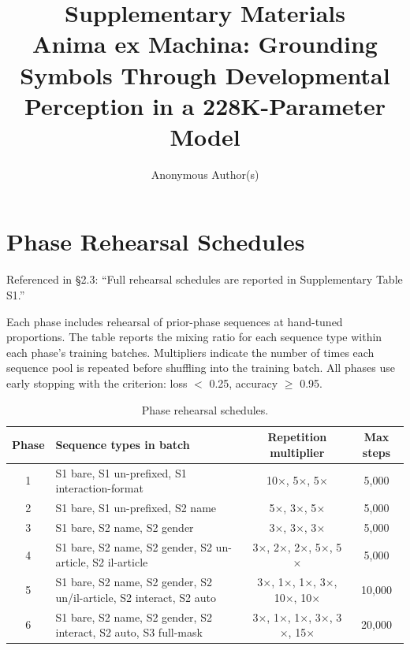 \documentclass{article}
\title{Supplementary Materials\\
\Large Anima ex Machina: Grounding Symbols Through Developmental Perception in a 228K-Parameter Model}
\author{
  Anonymous Author(s)
}
\begin{document}
\maketitle

\setcounter{section}{0}
\renewcommand{\thesection}{S\arabic{section}}
\renewcommand{\thetable}{S\arabic{table}}
\renewcommand{\thefigure}{S\arabic{figure}}

\section{Phase Rehearsal Schedules}

Referenced in \S2.3: ``Full rehearsal schedules are reported in Supplementary Table S1.''

Each phase includes rehearsal of prior-phase sequences at hand-tuned proportions. The table reports the mixing ratio for each sequence type within each phase's training batches. Multipliers indicate the number of times each sequence pool is repeated before shuffling into the training batch. All phases use early stopping with the criterion: loss $<$ 0.25, accuracy $\geq$ 0.95.

\begin{table}[htbp]
\centering
\small
\caption{Phase rehearsal schedules.}
\label{tab:rehearsal}
\begin{tabular}{clcc}
\toprule
Phase & Sequence types in batch & Repetition multiplier & Max steps \\
\midrule
1 & S1 bare, S1 un-prefixed, S1 interaction-format & 10$\times$, 5$\times$, 5$\times$ & 5,000 \\
2 & S1 bare, S1 un-prefixed, S2 name & 5$\times$, 3$\times$, 5$\times$ & 5,000 \\
3 & S1 bare, S2 name, S2 gender & 3$\times$, 3$\times$, 3$\times$ & 5,000 \\
4 & S1 bare, S2 name, S2 gender, S2 un-article, S2 il-article & 3$\times$, 2$\times$, 2$\times$, 5$\times$, 5$\times$ & 5,000 \\
5 & S1 bare, S2 name, S2 gender, S2 un/il-article, S2 interact, S2 auto & 3$\times$, 1$\times$, 1$\times$, 3$\times$, 10$\times$, 10$\times$ & 10,000 \\
6 & S1 bare, S2 name, S2 gender, S2 interact, S2 auto, S3 full-mask & 3$\times$, 1$\times$, 1$\times$, 3$\times$, 3$\times$, 15$\times$ & 20,000 \\
\bottomrule
\end{tabular}
\end{table}
\end{document}
